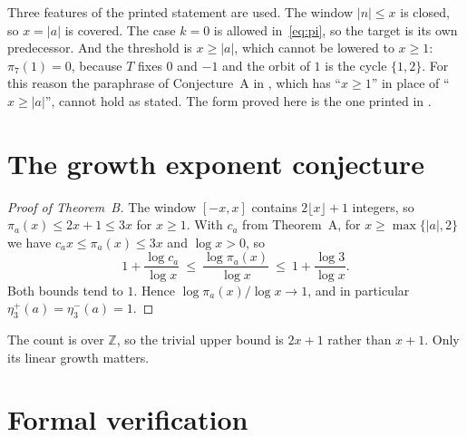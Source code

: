 \documentclass[11pt]{amsart}
\theoremstyle{definition}
\theoremstyle{remark}
\newcommand{\Z}{\mathbb{Z}}
\begin{document}
Three features of the printed statement are used. The window $|n|\le x$ is closed, so $x=|a|$ is
covered. The case $k=0$ is allowed in~\eqref{eq:pi}, so the target is its own predecessor. And the
threshold is $x\ge|a|$, which cannot be lowered to $x\ge1$: $\pi_7(1)=0$, because $T$ fixes $0$ and
$-1$ and the orbit of $1$ is the cycle $\{1,2\}$. For this reason the paraphrase of Conjecture~A in
\cite[after Conjecture~2.1]{KontorovichLagarias10}, which has ``$x\ge1$'' in place of ``$x\ge|a|$'',
cannot hold as stated. The form proved here is the one printed in \cite{AL95a}.

\section{The growth exponent conjecture}\label{sec:growth}

\begin{proof}[Proof of Theorem~B]
The window $[-x,x]$ contains $2\lfloor x\rfloor+1$ integers, so $\pi_a(x)\le2x+1\le3x$ for $x\ge1$.
With $c_a$ from Theorem~A, for $x\ge\max\{|a|,2\}$ we have
$c_ax\le\pi_a(x)\le3x$ and $\log x>0$, so
\[
  1+\frac{\log c_a}{\log x}\ \le\ \frac{\log\pi_a(x)}{\log x}\ \le\ 1+\frac{\log3}{\log x}.
\]
Both bounds tend to $1$. Hence $\log\pi_a(x)/\log x\to1$, and in particular
$\eta_3^{+}(a)=\eta_3^{-}(a)=1$.
\end{proof}

The count is over $\Z$, so the trivial upper bound is $2x+1$ rather than $x+1$. Only its linear
growth matters.

\section{Formal verification}\label{sec:verification}
\end{document}
